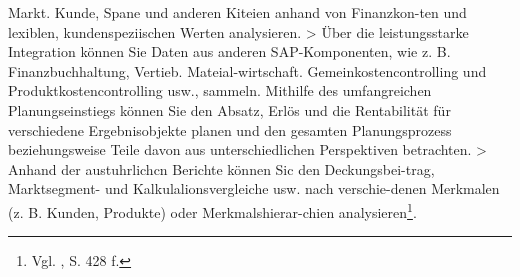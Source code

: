 Markt. Kunde, Spane und anderen Kiteien anhand von Finanzkon-ten und lexiblen, kundenspeziischen Werten analysieren.
> Über die leistungsstarke Integration können Sie Daten aus anderen
SAP-Komponenten, wie z. B. Finanzbuchhaltung, Vertieb. Mateial-wirtschaft. Gemeinkostencontrolling und Produktkostencontrolling
usw., sammeln. 
Mithilfe des umfangreichen Planungseinstiegs können Sie den
Absatz, Erlös und die Rentabilität für verschiedene Ergebnisobjekte
planen und den gesamten Planungsprozess beziehungsweise Teile
davon aus unterschiedlichen Perspektiven betrachten.
> Anhand der austuhrlichcn Berichte können Sic den Deckungsbei-trag, Marktsegment- und Kalkulalionsvergleiche usw. nach verschie-denen Merkmalen (z. B. Kunden, Produkte) oder Merkmalshierar-chien analysieren\footnote{Vgl. \cite{Patel2009}, S. 428 f.}.



























